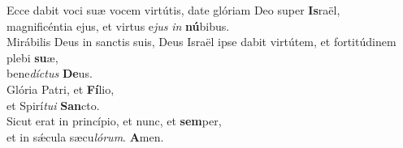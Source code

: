 \oddverse Ecce dabit voci suæ vocem virtútis, date glóriam Deo super \textbf{Is}raël,~\*\\
\oddverse magnificéntia ejus, et virtus e\textit{jus} \textit{in} \textbf{nú}bibus.\\
\evenverse Mirábilis Deus in sanctis suis, Deus Israël ipse dabit virtútem, et fortitúdinem plebi \textbf{su}æ,~\*\\
\evenverse bene\textit{dí}\textit{ctus} \textbf{De}us.\\
\oddverse Glória Patri, et \textbf{Fí}lio,~\*\\
\oddverse et Spirí\textit{tu}\textit{i} \textbf{San}cto.\\
\evenverse Sicut erat in princípio, et nunc, et \textbf{sem}per,~\*\\
\evenverse et in sǽcula sæcu\textit{ló}\textit{rum}. \textbf{A}men.\\

